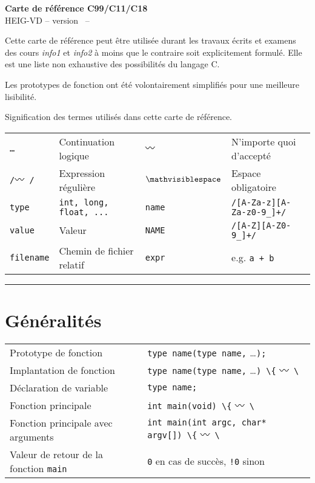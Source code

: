 \documentclass{article}
\newcommand{\etc}{\small \ldots}
\newcommand{\any}{$\hzigzag$~}
\newcommand{\spc}{$\mathvisiblespace$}
\newcommand{\cd}{\lstinline}
\begin{document}
\begin{multicols*}{3}

\begin{center}
  {\Large \bf Carte de référence C99/C11/C18} \\
  HEIG-VD -- version \revision \ -- \revisiondate \\
\end{center}

Cette carte de référence peut être utilisée durant les travaux écrits et examens
des cours \emph{info1} et \emph{info2} à moins que le contraire soit explicitement formulé.
Elle est une liste non exhaustive des possibilités du langage C.

Les prototypes de fonction ont été volontairement simplifiés pour une meilleure lisibilité.

Signification des termes utilisés dans cette carte de référence.

\begin{tabularx}{\linewidth}{
  >{\hsize=0.5\hsize}X%
  >{\hsize=1.5\hsize}X%
  >{\hsize=0.5\hsize}X%
  >{\hsize=1.5\hsize}X%
  }

  \tt \etc      & Continuation logique    & \tt \any    & N'importe quoi d'accepté \\
  \tt /\any/    & Expression régulière    & \tt \spc    & Espace obligatoire \\
  \cd{type}     & \tt int, long, float, ... & \cd{name} & \tt /[A-Za-z][A-Za-z0-9\_]+/ \\
  \cd{value}    & Valeur & \cd{NAME} & \tt /[A-Z][A-Z0-9\_]+/ \\
  \cd{filename} & Chemin de fichier relatif & \cd{expr}   & e.g. \tt a + b \\
\end{tabularx}
\hrule
\section*{Généralités}
\begin{tabularx}{\linewidth}{lX}
  Prototype de fonction              & \cd{type name(type name,} \etc \cd{);} \\
  Implantation de fonction           & \cd{type name(type name,} \etc \cd{) \{} \any \cd{\}} \\
  Déclaration de variable            & \cd{type name;} \\
  Fonction principale                & \cd{int main(void) \{} \any \cd{\}} \\
  Fonction principale avec arguments & \cd{int main(int argc, char* argv[]) \{} \any \cd{\}} \\
  Valeur de retour de la fonction \texttt{main} & \cd{0} en cas de succès, \cd{!0} sinon\\
\end{tabularx}


\end{multicols*}
\end{document}

